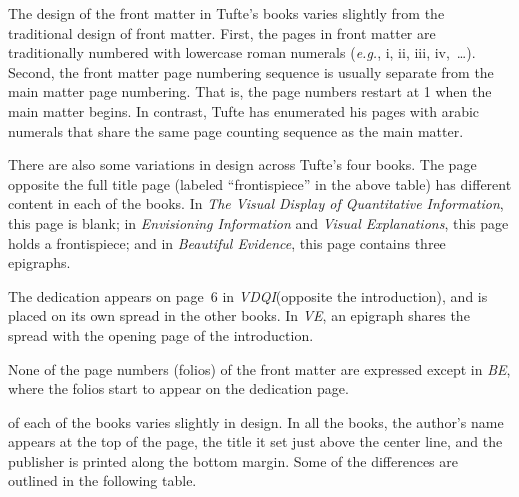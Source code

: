 \documentclass{tufte-book} %
\newcommand{\hairsp}{\hspace{1pt}} %
\newcommand{\eg}{\textit{e.\hairsp{}g.}\xspace} %
\newcommand{\vdqi}{\textit{VDQI}\xspace}
\newcommand{\ve}{\textit{VE}\xspace}
\newcommand{\be}{\textit{BE}\xspace}
\newcommand{\VDQI}{\textit{The Visual Display of Quantitative Information}\xspace}
\newcommand{\EI}{\textit{Envisioning Information}\xspace}
\newcommand{\VE}{\textit{Visual Explanations}\xspace}
\newcommand{\BE}{\textit{Beautiful Evidence}\xspace}
\begin{document}
\bigskip
The design of the front matter in Tufte's books varies slightly from the traditional design of front matter. First, the pages in front matter are traditionally numbered with lowercase roman numerals (\eg, i, ii, iii, iv,~\ldots). Second, the front matter page numbering sequence is usually separate from the main matter page numbering. That is, the page numbers restart at 1 when the main matter begins. In contrast, Tufte has enumerated his pages with arabic numerals that share the same page counting sequence as the main matter.

There are also some variations in design across Tufte's four books. The page opposite the full title page (labeled ``frontispiece'' in the above table) has different content in each of the books. In \VDQI, this page is blank; in \EI and \VE, this page holds a frontispiece; and in \BE, this page contains three epigraphs.

The dedication appears on page~6 in \vdqi (opposite the introduction), and is placed on its own spread in the other books. In \ve, an epigraph shares the spread with the opening page of the introduction.

None of the page numbers (folios) of the front matter are expressed except in \be, where the folios start to appear on the dedication page.

 of each of the books varies slightly in design. In all the books, the author's name appears at the top of the page, the title it set just above the center line, and the publisher is printed along the bottom margin. Some of the differences are outlined in the following table.
\end{document}
